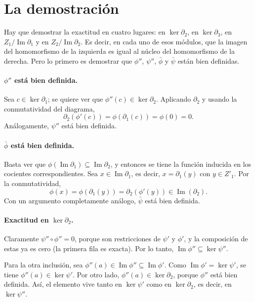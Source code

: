 \documentclass[11pt]{article}
\begin{document}
\section*{La demostración}

Hay que demostrar la exactitud en cuatro lugares: en $\ker\partial_2$, en $\ker\partial_3$, en $Z_1/\operatorname{Im}\partial_1$ y en $Z_2/\operatorname{Im}\partial_2$. Es decir, en cada uno de esos módulos, que la imagen del homomorfismo de la izquierda es igual al núcleo del homomorfismo de la derecha. Pero lo primero es demostrar que $\phi''$, $\psi''$, $\bar\phi$ y $\bar\psi$ están bien definidas.

\paragraph{$\phi''$ está bien definida.} Sea $c\in\ker\partial_1$; se quiere ver que $\phi''(c)\in\ker\partial_2$. Aplicando $\partial_2$ y usando la conmutatividad del diagrama,
\[
  \partial_2(\phi'(c))=\phi(\partial_1(c))=\phi(0)=0 .
\]
Análogamente, $\psi''$ está bien definida.

\paragraph{$\bar\phi$ está bien definida.} Basta ver que $\phi(\operatorname{Im}\partial_1)\subseteq\operatorname{Im}\partial_2$, y entonces se tiene la función inducida en los cocientes correspondientes. Sea $x\in\operatorname{Im}\partial_1$, es decir, $x=\partial_1(y)$ con $y\in Z'_1$. Por la conmutatividad,
\[
  \phi(x)=\phi(\partial_1(y))=\partial_2(\phi'(y))\in\operatorname{Im}(\partial_2).
\]
Con un argumento completamente análogo, $\bar\psi$ está bien definida.

\paragraph{Exactitud en $\ker\partial_2$.} Claramente $\psi''\circ\phi''=0$, porque son restricciones de $\psi'$ y $\phi'$, y la composición de estas ya es cero (la primera fila es exacta). Por lo tanto, $\operatorname{Im}\phi''\subseteq\ker\psi''$.

Para la otra inclusión, sea $\phi''(a)\in\operatorname{Im}\phi''\subseteq\operatorname{Im}\phi'$. Como $\operatorname{Im}\phi'=\ker\psi'$, se tiene $\phi''(a)\in\ker\psi'$. Por otro lado, $\phi''(a)\in\ker\partial_2$, porque $\phi''$ está bien definida. Así, el elemento vive tanto en $\ker\psi'$ como en $\ker\partial_2$, es decir, en $\ker\psi''$.
\end{document}
